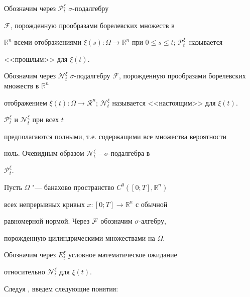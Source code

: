 Обозначим через $\mathcal{ P}^\xi_t$ $\sigma$-подалгебру

       $\mathcal{F}$, порожденную прообразами борелевских множеств в

       $\mathbb{R}^n$ всеми отображениями $\xi(s):\Omega\rightarrow

       \mathbb{R}^n$ при $0\le s\le t$; $\mathcal{P}^\xi_t$~называется

       <<прошлым>> для $\xi(t)$.



       Обозначим через $\mathcal{ N}^\xi_t$ $\sigma$-подалгебру $\mathcal

       {F}$, порожденную прообразами борелевских множеств в $\mathbb{R}^n$

       отображением $\xi(t):\Omega\rightarrow \mathcal{R}^n$; $\mathcal{

       N}^\xi_t$ называется <<настоящим>> для $\xi(t)$.



       $\mathcal{ P}^\xi_t$ и $\mathcal{N}^\xi_t$ при всех $t$

       предполагаются полными, т.е. содержащими все множества вероятности

       ноль. Очевидным образом $\mathcal{N}^\xi_t$ -- $\sigma$-подалгебра в

       $\mathcal{ P}^\xi_t$.



Пусть  $\Omega$ "--- банахово пространство $C^0([0;T], \mathbb{R}^n)$

всех непрерывных кривых $x:[0;T]\to \mathbb{R}^n$  с обычной

равномерной нормой. Через ${\cal F}$ обозначим $\sigma$-алгебру,

порожденную цилиндрическими множествами на $\Omega$.



       Обозначим через $E^\xi_t$ условное математическое ожидание

       относительно $\mathcal{ N}^\xi_t$ для $\xi(t)$.



Следуя \cite{popovkoval:bib:GS,popovkoval:bib:N1,popovkoval:bib:N2,popovkoval:bib:N3, popovkoval:bib:G}, введем следующие понятия:



